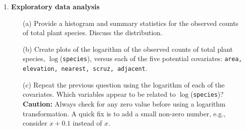 \documentclass[11pt]{article}
\begin{document}
\begin{enumerate}
\item {\bf Exploratory data analysis}
\begin{itemize}
\item[(a)] Provide a histogram and summary statistics for the observed counts of total plant species.  Discuss the distribution.  
\item[(b)] Create plots of the logarithm of the observed counts of total plant species, $\log$({\tt species}), versus each of the five potential covariates: {\tt area, elevation, nearest, scruz, adjacent}. 
\item[(c)] Repeat the previous question using the logarithm of each of the covariates. Which variables appear to be related to $\log$({\tt species})?\\
{\bf Caution:} Always check for any zero value before using a logarithm transformation. A quick fix is to add a small non-zero number, e.g., consider $x+0.1$ instead of $x$.
\end{itemize}


\end{enumerate}
\end{document}
